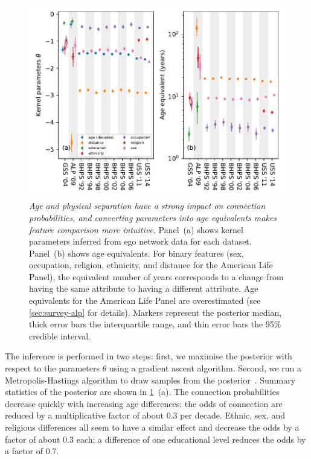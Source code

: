 \documentclass{scrartcl}
\newcommand{\titlecaption}[2]{\caption[#1]{\emph{#1} #2}}
\begin{document}
\begin{refsection}
\begin{figure}
    \includegraphics{coefficients-age-equivalent}
    \titlecaption{Age and physical separation have a strong impact on connection probabilities, and converting parameters into age equivalents makes feature comparison more intuitive.}{
    Panel~(a) shows kernel parameters inferred from ego network data for each dataset.
    Panel~(b) shows age equivalents. For binary features (sex, occupation, religion, ethnicity, and distance for the American Life Panel), the equivalent number of years corresponds to a change from having the same attribute to having a different attribute. Age equivalents for the American Life Panel are overestimated (see \cref{sec:survey-alp} for details).
    Markers represent the posterior median, thick error bars the interquartile range, and thin error bars the 95\% credible interval.\label{fig:parameters-and-age-equivalents}}
\end{figure}

The inference is performed in two steps: first, we maximise the posterior with respect to the parameters $\theta$ using a gradient ascent algorithm. Second, we run a Metropolis-Hastings algorithm to draw samples from the posterior~\cite{Hastings1970}. Summary statistics of the posterior are shown in \cref{fig:parameters-and-age-equivalents}~(a). The connection probabilities decrease quickly with increasing age differences: the odds of connection are reduced by a multiplicative factor of about 0.3 per decade. Ethnic, sex, and religious differences all seem to have a similar effect and decrease the odds by a factor of about 0.3 each; a difference of one educational level reduces the odds by a factor of 0.7.


\end{refsection}
\end{document}
